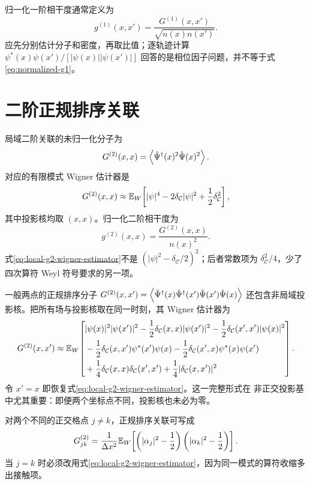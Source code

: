归一化一阶相干度通常定义为
\begin{equation}
  g^{(1)}(x,x')=
  \frac{G^{(1)}(x,x')}{\sqrt{n(x)n(x')}}.
  \label{eq:normalized-g1}
\end{equation}
应先分别估计分子和密度，再取比值；逐轨迹计算
$\psi^*(x)\psi(x')/[|\psi(x)||\psi(x')|]$ 回答的是相位因子问题，并不等于式\eqref{eq:normalized-g1}。

\section{二阶正规排序关联}

局域二阶关联的未归一化分子为
\begin{equation}
  G^{(2)}(x,x)
  =\left\langle \hat{\Psi}^{\dagger}(x)^2\hat{\Psi}(x)^2\right\rangle.
\end{equation}
对应的有限模式 Wigner 估计器是
\begin{equation}
  G^{(2)}(x,x)
  \approx\mathbb{E}_{W}\!\left[
  |\psi|^4-2\delta_{\mathcal C}|\psi|^2
  +\frac12\delta_{\mathcal C}^2\right],
  \label{eq:local-g2-wigner-estimator}
\end{equation}
其中投影核均取 $(x,x)$。归一化二阶相干度为
\begin{equation}
  g^{(2)}(x,x)=\frac{G^{(2)}(x,x)}{n(x)^2}.
  \label{eq:normalized-g2}
\end{equation}
式\eqref{eq:local-g2-wigner-estimator}不是
$(|\psi|^2-\delta_{\mathcal C}/2)^2$；后者常数项为
$\delta_{\mathcal C}^2/4$，少了四次算符 Weyl 符号要求的另一项。

一般两点的正规排序分子
$G^{(2)}(x,x')=\left\langle \hat{\Psi}^{\dagger}(x)\hat{\Psi}^{\dagger}(x')\hat{\Psi}(x')\hat{\Psi}(x)\right\rangle$
还包含非局域投影核。把所有场与投影核取在同一时刻，其 Wigner 估计器为
\begin{equation}
  G^{(2)}(x,x')\approx\mathbb{E}_{W}\!\left[\begin{aligned}
  &|\psi(x)|^2|\psi(x')|^2
  -\frac12\delta_{\mathcal C}(x,x)|\psi(x')|^2
  -\frac12\delta_{\mathcal C}(x',x')|\psi(x)|^2 \\
  &-\frac12\delta_{\mathcal C}(x,x')\psi^*(x')\psi(x)
  -\frac12\delta_{\mathcal C}(x',x)\psi^*(x)\psi(x') \\
  &+\frac14\delta_{\mathcal C}(x,x)\delta_{\mathcal C}(x',x')
  +\frac14|\delta_{\mathcal C}(x,x')|^2
  \end{aligned}\right].
  \label{eq:nonlocal-g2-general}
\end{equation}
令 $x'=x$ 即恢复式\eqref{eq:local-g2-wigner-estimator}。这一完整形式在
非正交投影基中尤其重要：即便两个坐标点不同，投影核也未必为零。

对两个不同的正交格点 $j\neq k$，正规排序关联可写成
\begin{equation}
  G^{(2)}_{jk}
  =\frac{1}{\Delta x^2}
  \mathbb{E}_{W}\!\left[
  \left(|\alpha_j|^2-\frac12\right)
  \left(|\alpha_k|^2-\frac12\right)\right].
  \label{eq:nonlocal-g2-grid}
\end{equation}
当 $j=k$ 时必须改用式\eqref{eq:local-g2-wigner-estimator}，因为同一模式的算符收缩多出接触项。

